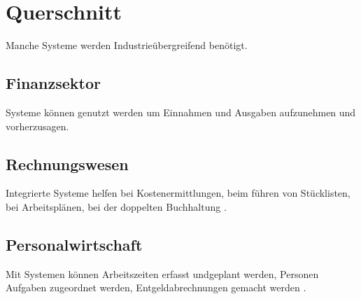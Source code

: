 \documentclass{article}
\begin{document}
\section{Querschnitt}
Manche Systeme werden Industrieübergreifend benötigt.

\subsection{Finanzsektor}
Systeme können genutzt werden um Einnahmen und Ausgaben aufzunehmen und vorherzusagen.

\subsection{Rechnungswesen}
Integrierte Systeme helfen bei Kostenermittlungen, beim führen von Stücklisten, bei Arbeitsplänen, bei der doppelten Buchhaltung \etc.

\subsection{Personalwirtschaft}
Mit Systemen können Arbeitszeiten erfasst undgeplant werden, Personen Aufgaben zugeordnet werden, Entgeldabrechnungen gemacht werden \etc.
\end{document}
